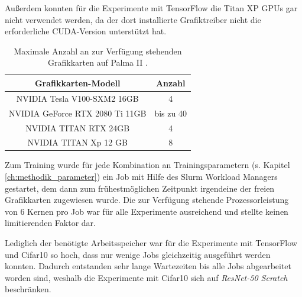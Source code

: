 Außerdem konnten für die Experimente mit TensorFlow \cite{tensorflow} die Titan XP GPUs gar nicht verwendet werden, da der dort installierte Grafiktreiber nicht die erforderliche CUDA-Version unterstützt hat.

\begin{table}[H]
\centering
\begin{tabular}{|c|c|}
\hline 
Grafikkarten-Modell & Anzahl \\ 
\hline 
NVIDIA Tesla V100-SXM2 16GB & 4 \\ 
\hline 
NVIDIA GeForce RTX 2080 Ti 11GB & bis zu 40\\
\hline
NVIDIA TITAN RTX 24GB & 4\\
\hline
NVIDIA TITAN Xp 12 GB & 8\\
\hline
\end{tabular} 
\caption{Maximale Anzahl an zur Verfügung stehenden Grafikkarten auf Palma II \cite{palma2}.}
\label{tab:palmaGPUs}
\end{table}

Zum Training wurde für jede Kombination an Trainingsparametern (s. Kapitel \ref{ch:methodik_parameter}) ein Job mit Hilfe des Slurm Workload Managers \cite{slurm} gestartet, dem dann zum frühestmöglichen Zeitpunkt irgendeine der freien Grafikkarten zugewiesen wurde. Die zur Verfügung stehende Prozessorleistung von 6 Kernen pro Job war für alle Experimente ausreichend und stellte keinen limitierenden Faktor dar.

Lediglich der benötigte Arbeitsspeicher war für die Experimente mit TensorFlow \cite{tensorflow} und Cifar10 \cite{cifar10} so hoch, dass nur wenige Jobs gleichzeitig ausgeführt werden konnten. Dadurch entstanden sehr lange Wartezeiten bis alle Jobs abgearbeitet worden sind, weshalb die Experimente mit Cifar10 \cite{cifar10} sich auf \textit{ResNet-50 Scratch} beschränken.

